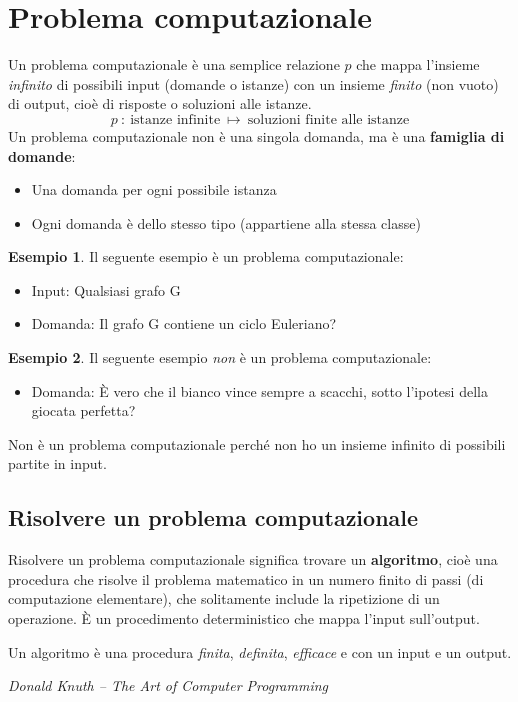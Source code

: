 \documentclass[a4paper]{article}
\theoremstyle{definition}
\newtheorem{esempio}{Esempio}[subsection]
\begin{document}
	\section{Problema computazionale}
		Un problema computazionale è una semplice relazione $ p $ che mappa l'insieme \textit{infinito} di possibili input (domande o istanze) con un insieme \textit{finito} (non vuoto) di output, cioè di risposte o soluzioni alle istanze.
		\[
			p\ \colon\ \text{istanze infinite}\ \mapsto\ \text{soluzioni finite alle istanze} 
		\]
		Un problema computazionale non è una singola domanda, ma è una \textbf{famiglia di domande}:
		\begin{itemize}
			\item Una domanda per ogni possibile istanza
			\item Ogni domanda è dello stesso tipo (appartiene alla stessa classe)
		\end{itemize}
		
		\begin{esempio}
			Il seguente esempio è un problema computazionale:
			\begin{itemize}
				\item Input: Qualsiasi grafo G
				\item Domanda: Il grafo G contiene un ciclo Euleriano?
			\end{itemize}
		\end{esempio}
		\begin{esempio}
			Il seguente esempio \textit{non} è un problema computazionale:
			\begin{itemize}
				\item Domanda: È vero che il bianco vince sempre a scacchi, sotto l'ipotesi della giocata perfetta?
			\end{itemize}
			Non è un problema computazionale perché non ho un insieme infinito di possibili partite in input.
		\end{esempio}
		
		\subsection{Risolvere un problema computazionale}
			Risolvere un problema computazionale significa trovare un \textbf{algoritmo}, cioè una procedura che risolve il problema matematico in un numero finito di passi (di computazione elementare), che solitamente include la ripetizione di un operazione. È un procedimento deterministico che mappa l'input sull'output.
			\epigraph{
				Un algoritmo è una procedura \textit{finita}, \textit{definita}, \textit{efficace} e con un input e un output.}{\textit{Donald Knuth -- The Art of Computer Programming }}
			
\end{document}

